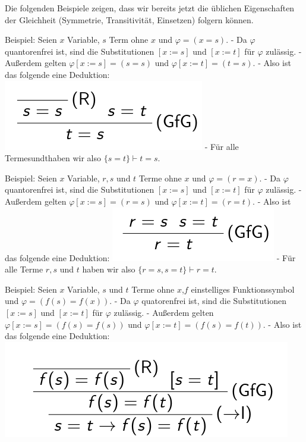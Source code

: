\documentclass[a4paper]{article}
\begin{document}
\begin{multicols}{3}
  Die folgenden Beispiele zeigen, dass wir bereits jetzt die üblichen
  Eigenschaften der Gleichheit (Symmetrie, Transitivität, Einsetzen)
  folgern können.

  Beispiel: Seien $x$ Variable, $s$ Term ohne $x$ und $\varphi=(x=s)$. -
  Da $\varphi$ quantorenfrei ist, sind die Substitutionen $[x:=s]$ und
  $[x:=t]$ für $\varphi$ zulässig. - Außerdem gelten
  $\varphi[x:=s] = (s=s)$ und $\varphi[x:=t] = (t=s)$. - Also ist das
  folgende eine Deduktion:
  \includegraphics[width=\linewidth]{Assets/Logik-deduktion-beispiel.png} - Für alle
  Termesundthaben wir also $\{s=t\}\vdash t=s$.

  Beispiel: Seien $x$ Variable, $r,s$ und $t$ Terme ohne $x$ und
  $\varphi=(r=x)$. - Da $\varphi$ quantorenfrei ist, sind die
  Substitutionen $[x:=s]$ und $[x:=t]$ für $\varphi$ zulässig. - Außerdem
  gelten $\varphi[x:=s]=(r=s)$ und $\varphi[x:=t]=(r=t)$. - Also ist das
  folgende eine Deduktion:
  \includegraphics[width=\linewidth]{Assets/Logik-deduktion-beispiel-2.png} - Für alle Terme
  $r,s$ und $t$ haben wir also $\{r=s,s=t\}\vdash r=t$.

  Beispiel: Seien $x$ Variable, $s$ und $t$ Terme ohne $x$,$f$
  einstelliges Funktionssymbol und $\varphi=(f(s)=f(x))$. - Da $\varphi$
  quatorenfrei ist, sind die Substitutionen $[x:=s]$ und $[x:=t]$ für
  $\varphi$ zulässig. - Außerdem gelten $\varphi[x:=s]=(f(s)=f(s))$ und
  $\varphi[x:=t]=(f(s)=f(t))$. - Also ist das folgende eine Deduktion:
  \includegraphics[width=\linewidth]{Assets/Logik-deduktion-beispiel-3.png}


\end{multicols}
\end{document}
